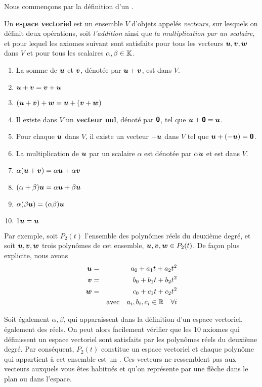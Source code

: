 Nous commençons par la définition d'un .

\begin{defini}
Un \textbf{espace vectoriel} est un ensemble $V$ d'objets appelés \textit{vecteurs}, sur lesquels on définit
deux opérations, soit \textit{l'addition} ainsi que \textit{la multiplication par un scalaire}, et pour lequel
les axiomes suivant sont satisfaits pour tous les vecteurs $\boldsymbol{u}, \boldsymbol{v}, \boldsymbol{w}$ dans $V$
et pour tous les scalaires $\alpha, \beta \in \mathbb{K}$.
\begin{enumerate}
\item La somme de $\boldsymbol{u}$ et $\boldsymbol{v}$, dénotée par  $\boldsymbol{u}+\boldsymbol{v}$, est dans $V$.
\item $\boldsymbol{u} + \boldsymbol{v} = \boldsymbol{v} + \boldsymbol{u}$
\item $ (\boldsymbol{u} + \boldsymbol{v}) + \boldsymbol{w} = \boldsymbol{u} + (\boldsymbol{v} + \boldsymbol{w})$
\item Il existe dans $V$ un \textbf{vecteur nul}, dénoté par $\mbox{\textsf{\textbf{{0}}}}$, tel que $\boldsymbol{u} + \mbox{\textsf{\textbf{{0}}}} = \boldsymbol{u}$.
\item Pour chaque $\boldsymbol{u}$ dans $V$, il existe un vecteur $-\boldsymbol{u}$ dans $V$ tel que
$\boldsymbol{u} + (-\boldsymbol{u}) = \mbox{\textsf{\textbf{{0}}}}$.
\item La multiplication de $\boldsymbol{u}$ par un scalaire $\alpha$ est dénotée par $\alpha\boldsymbol{u}$ et est dans $V$.
\item $\alpha(\boldsymbol{u} + \boldsymbol{v}) = \alpha\boldsymbol{u} + \alpha\boldsymbol{v}$
\item $ (\alpha + \beta)\boldsymbol{u} = \alpha\boldsymbol{u} + \beta\boldsymbol{u}$
\item $\alpha(\beta\boldsymbol{u}) = (\alpha\beta)\boldsymbol{u}$
\item $1\boldsymbol{u} = \boldsymbol{u}$
\end{enumerate}
\end{defini}

Par exemple, soit $P_2(t)$ l'ensemble des polynômes réels du deuxième degré, et soit $\boldsymbol{u}, \boldsymbol{v}, \boldsymbol{w}$ trois polynômes de cet ensemble, $\boldsymbol{u}, \boldsymbol{v}, \boldsymbol{w} \in P_2(t)$.  De façon plus explicite, nous avons 
\begin{eqnarray*}
\boldsymbol{u} &=& a_0 + a_1t + a_2 t^2 \\
\boldsymbol{v} &=& b_0 + b_1t + b_2 t^2 \\
\boldsymbol{w} &=& c_0 + c_1t + c_2 t^2 \\
&& \mbox{avec}\quad a_i, b_i, c_i \in \mathbb{R} \quad\forall i
\end{eqnarray*}


Soit également $\alpha, \beta$, qui apparaissent dans la définition d'un espace vectoriel, également des réels.
On peut alors facilement vérifier que les 10 axiomes qui définissent un espace vectoriel sont satisfaits
par les polynômes réels du deuxième degré.   Par conséquent, $P_2(t)$ constitue un
espace vectoriel et chaque polynôme qui appartient à cet ensemble est un .
Ces vecteurs ne ressemblent pas aux vecteurs auxquels vous êtes habitués et qu'on
représente par une flèche dans le plan ou dans l'espace.

